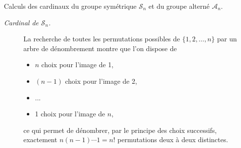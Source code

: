 \documentclass{article}
\begin{document}
\begin{question_kholle}{Calculs des cardinaux du groupe symétrique $\mathcal{S}_{n}$ et du groupe alterné $\mathcal{A}_{n}$.}
	\hfill
	\begin{description}
		\item[\textit{Cardinal de $\mathcal{S}_{n}$.}] La recherche de toutes les permutations possibles de $\{1,2,\dots,n\}$ par un arbre de dénombrement montre que l’on dispose de \begin{itemize}
			      \item $n$ choix pour l’image de 1,
			      \item $(n-1)$ choix pour l’image de 2,
			      \item ...
			      \item 1 choix pour l’image de $n$,
		      \end{itemize} ce qui permet de dénombrer, par le principe des choix successifs, exactement $n(n-1)\cdots 1= n!$ permutations deux à deux distinctes.


\end{description}
\end{question_kholle}
\end{document}
